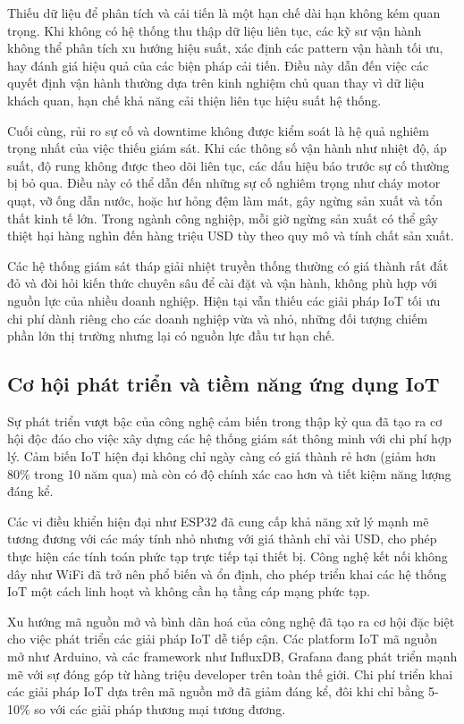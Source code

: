 \documentclass[../main.tex]{subfiles}
\begin{document}
Thiếu dữ liệu để phân tích và cải tiến là một hạn chế dài hạn không kém quan trọng. Khi không có hệ thống thu thập dữ liệu liên tục, các kỹ sư vận hành không thể phân tích xu hướng hiệu suất, xác định các pattern vận hành tối ưu, hay đánh giá hiệu quả của các biện pháp cải tiến. Điều này dẫn đến việc các quyết định vận hành thường dựa trên kinh nghiệm chủ quan thay vì dữ liệu khách quan, hạn chế khả năng cải thiện liên tục hiệu suất hệ thống.

Cuối cùng, rủi ro sự cố và downtime không được kiểm soát là hệ quả nghiêm trọng nhất của việc thiếu giám sát. Khi các thông số vận hành như nhiệt độ, áp suất, độ rung không được theo dõi liên tục, các dấu hiệu báo trước sự cố thường bị bỏ qua. Điều này có thể dẫn đến những sự cố nghiêm trọng như cháy motor quạt, vỡ ống dẫn nước, hoặc hư hỏng đệm làm mát, gây ngừng sản xuất và tổn thất kinh tế lớn. Trong ngành công nghiệp, mỗi giờ ngừng sản xuất có thể gây thiệt hại hàng nghìn đến hàng triệu USD tùy theo quy mô và tính chất sản xuất.

Các hệ thống giám sát tháp giải nhiệt truyền thống thường có giá thành rất đắt đỏ và đòi hỏi kiến thức chuyên sâu để cài đặt và vận hành, không phù hợp với nguồn lực của nhiều doanh nghiệp. Hiện tại vẫn thiếu các giải pháp IoT tối ưu chi phí dành riêng cho các doanh nghiệp vừa và nhỏ, những đối tượng chiếm phần lớn thị trường nhưng lại có nguồn lực đầu tư hạn chế.

\subsection{Cơ hội phát triển và tiềm năng ứng dụng IoT}
\label{sec:iot_development_opportunities}

Sự phát triển vượt bậc của công nghệ cảm biến trong thập kỷ qua đã tạo ra cơ hội độc đáo cho việc xây dựng các hệ thống giám sát thông minh với chi phí hợp lý. Cảm biến IoT hiện đại không chỉ ngày càng có giá thành rẻ hơn (giảm hơn 80\% trong 10 năm qua) mà còn có độ chính xác cao hơn và tiết kiệm năng lượng đáng kể.

Các vi điều khiển hiện đại như ESP32 đã cung cấp khả năng xử lý mạnh mẽ tương đương với các máy tính nhỏ nhưng với giá thành chỉ vài USD, cho phép thực hiện các tính toán phức tạp trực tiếp tại thiết bị. Công nghệ kết nối không dây như WiFi đã trở nên phổ biến và ổn định, cho phép triển khai các hệ thống IoT một cách linh hoạt và không cần hạ tầng cáp mạng phức tạp.

Xu hướng mã nguồn mở và bình dân hoá của công nghệ đã tạo ra cơ hội đặc biệt cho việc phát triển các giải pháp IoT dễ tiếp cận. Các platform IoT mã nguồn mở như Arduino, và các framework như InfluxDB, Grafana đang phát triển mạnh mẽ với sự đóng góp từ hàng triệu developer trên toàn thế giới. Chi phí triển khai các giải pháp IoT dựa trên mã nguồn mở đã giảm đáng kể, đôi khi chỉ bằng 5-10\% so với các giải pháp thương mại tương đương.
\end{document}
